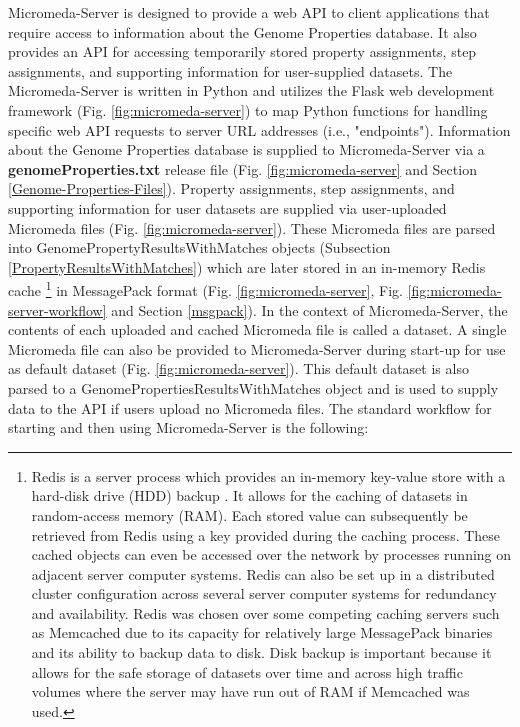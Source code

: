 Micromeda-Server is designed to provide a web API to client applications that require access to information about the Genome Properties database. It also provides an API for accessing temporarily stored property assignments, step assignments, and supporting information for user-supplied datasets. The Micromeda-Server is written in Python and utilizes the Flask web development framework \cite{grinberg2018flask} (Fig. \ref{fig:micromeda-server}) to map Python functions for handling specific web API requests to server URL addresses (i.e., "endpoints"). Information about the Genome Properties database is supplied to Micromeda-Server via a \textbf{genomeProperties.txt} release file (Fig. \ref{fig:micromeda-server} and Section \ref{Genome-Properties-Files}). Property assignments, step assignments, and supporting information for user datasets are supplied via user-uploaded Micromeda files (Fig. \ref{fig:micromeda-server}). These Micromeda files are parsed into GenomePropertyResultsWithMatches objects (Subsection \ref{PropertyResultsWithMatches}) which are later stored in an in-memory Redis cache \footnote{Redis is a server process which provides an in-memory key-value store with a hard-disk drive (HDD) backup \cite{han2011survey}. It allows for the caching of datasets in random-access memory (RAM). Each stored value can subsequently be retrieved from Redis using a key provided during the caching process. These cached objects can even be accessed over the network by processes running on adjacent server computer systems. Redis can also be set up in a distributed cluster configuration across several server computer systems for redundancy and availability. Redis was chosen over some competing caching servers such as Memcached \cite{fitzpatrick2004distributed} due to its capacity for relatively large MessagePack binaries \cite{furuhashi2013messagepack} and its ability to backup data to disk. Disk backup is important because it allows for the safe storage of datasets over time and across high traffic volumes where the server may have run out of RAM if Memcached was used.} in MessagePack format \cite{furuhashi2013messagepack} (Fig. \ref{fig:micromeda-server}, Fig. \ref{fig:micromeda-server-workflow} and Section \ref{msgpack}). In the context of Micromeda-Server, the contents of each uploaded and cached Micromeda file is called a dataset. A single Micromeda file can also be provided to Micromeda-Server during start-up for use as default dataset (Fig. \ref{fig:micromeda-server}). This default dataset is also parsed to a GenomePropertiesResultsWithMatches object and is used to supply data to the API if users upload no Micromeda files. The standard workflow for starting and then using Micromeda-Server is the following:

